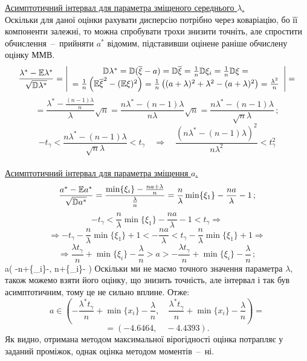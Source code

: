 \documentclass[14pt,a4paper]{scrartcl}
\begin{document}
\newpage
\underline{Асимптотичний інтервал для параметра зміщеного середнього $\lambda$.}\\

Оскільки для даної оцінки рахувати дисперсію потрібно через коваріацію, бо її компоненти залежні, то можна спробувати трохи знизити точніть, але спростити обчислення~--~прийняти $a^*$ відомим, підставивши оцінене раніше обчислену оцінку ММВ.
$$\frac{\lambda^*-\mathbb{E}\lambda^*}{\sqrt{\mathbb{D}\lambda^*}}=
\left|\begin{array}{c}
  \mathbb{D}\lambda^*=\mathbb{D}(\overline{\xi}-a)=\mathbb{D}\overline{\xi}=\frac1n\mathbb{D}\xi_i=\frac1n\mathbb{D}\xi=\\
  =\frac1n\left(\mathbb{E}\overline{\xi}^2-(\mathbb{E}\xi)^2\right)=\frac1n\left((a+\lambda)^2+\lambda^2-(a+\lambda)^2\right)=\frac{\lambda^2}n
\end{array}\right|=$$
$$=\frac{\lambda^*-\frac{(n-1)\lambda}n}{\lambda}\sqrt{n}=
\frac{n\lambda^*-(n-1)\lambda}{n\lambda}\sqrt{n}=
\frac{n\lambda^*-(n-1)\lambda}{\sqrt{n}\lambda}\,;$$
$$-t_\gamma<\frac{n\lambda^*-(n-1)\lambda}{\sqrt{n}\lambda}<t_\gamma\quad\Rightarrow\quad
\frac{(n\lambda^*-(n-1)\lambda)^2}{n\lambda^2}<t_\gamma^2$$
\\



\underline{Асимптотичний інтервал для параметра зміщення $a$.}\\
$$\frac{a^*-\mathbb{E} a^*}{\sqrt{\mathbb{D} a^*}}=
\frac{\min\{\xi_i\}-\frac{na+\lambda}{n}}{\frac{\lambda}n}=
\frac{n}\lambda\min\{\xi_1\}-\frac{na}\lambda-1\,;$$
$$-t_\gamma<\frac{n}\lambda\min\{\xi_1\}-\frac{na}\lambda-1<t_\gamma\Rightarrow$$
$$\Rightarrow-t_\gamma-\frac{n}\lambda\min\{\xi_1\}+1<
-\frac{na}\lambda<
t_\gamma-\frac{n}\lambda\min\{\xi_1\}+1\Rightarrow$$
$$\Rightarrow\frac{\lambda t_\gamma}n+\min\{\xi_i\}-\frac\lambda{n}
>a>
-\frac{\lambda t_\gamma}n+\min\{\xi_i\}-\frac\lambda{n}\,;$$
\be a\in\left(
-n+\min\{\xi_i\}-\frac{},\quad
{}n+\min\{\xi_i\}-\frac{}
\right)\ee
Оскільки ми не маємо точного значення параметра $\lambda$, також можемо взяти його оцінку, що знизить точність, але інтервал і так був асимптотичним, тому це не сильно вплине. Отже:
$$a\in\left(-\frac{\lambda^*t_\gamma}n+\min\{x_i\}-\frac{\lambda}n,\quad
\frac{\lambda^*t_\gamma}n+\min\{x_i\}-\frac{\lambda}n\right)=$$
$$=(-4.6464,\quad-4.4393).$$
Як видно, отримана методом максимальної вірогідності оцінка потрапляє у заданий проміжок, однак оцінка методом моментів~--~ні.
\end{document}
